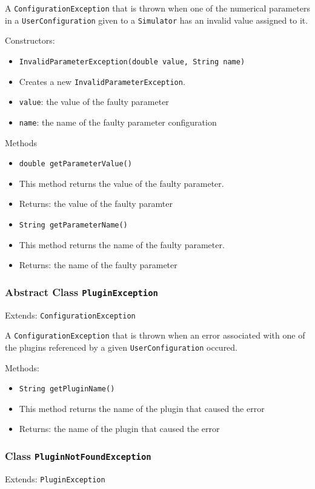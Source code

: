 \documentclass[parskip=full,11pt]{scrartcl}
\begin{document}
A \texttt{ConfigurationException} that is thrown when one of the numerical parameters in a \texttt{UserConfiguration} given to a \texttt{Simulator} has an invalid value assigned to it.

Constructors:
\begin{itemize} \itemsep -10pt
	\item \texttt{InvalidParameterException(double value, String name)}
	\item[] Creates a new \texttt{InvalidParameterException}.
	\item[] \texttt{value}: the value of the faulty parameter
	\item[] \texttt{name}: the name of the faulty parameter configuration
\end{itemize}

Methods
\begin{itemize}\itemsep -10pt
	\item \texttt{double getParameterValue()}
	\item[] This method returns the value of the faulty parameter.
	\item[] Returns: the value of the faulty paramter
	\item \texttt{String getParameterName()}
	\item[] This method returns the name of the faulty parameter.
	\item[] Returns: the name of the faulty parameter
\end{itemize}

\subsubsection{Abstract Class \texttt{PluginException}}
Extends: \texttt{ConfigurationException}

A \texttt{ConfigurationException} that is thrown when an error associated with one of the plugins referenced by a given \texttt{UserConfiguration} occured.

Methods:
\begin{itemize} \itemsep -10pt
	\item \texttt{String getPluginName()}
	\item[] This method returns the name of the plugin that caused the error
	\item[] Returns: the name of the plugin that caused the error
\end{itemize}

\subsubsection{Class \texttt{PluginNotFoundException}}
Extends: \texttt{PluginException}
\end{document}
